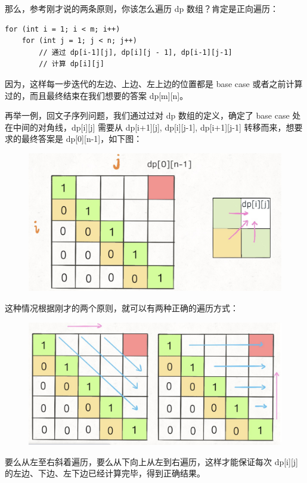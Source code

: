 \documentclass[12pt]{article}
\begin{document}
那么，参考刚才说的两条原则，你该怎么遍历 dp 数组？肯定是正向遍历：
\begin{lstlisting}
for (int i = 1; i < m; i++)
    for (int j = 1; j < n; j++)
        // 通过 dp[i-1][j], dp[i][j - 1], dp[i-1][j-1]
        // 计算 dp[i][j]
\end{lstlisting}
因为，这样每一步迭代的左边、上边、左上边的位置都是 base case 或者之前计算过的，而且最终结束在我们想要的答案 dp[m][n]。

再举一例，回文子序列问题，我们通过过对 dp 数组的定义，确定了 base case 处在中间的对角线，dp[i][j] 需要从 dp[i+1][j], dp[i][j-1], dp[i+1][j-1] 转移而来，想要求的最终答案是 dp[0][n-1]，如下图：
\begin{figure}[H]
    \centering
    \includegraphics[width=1\textwidth]{fig/Dynamic_Programming_Longest_Recursive_Text_1.png}
\end{figure}

这种情况根据刚才的两个原则，就可以有两种正确的遍历方式：
\begin{figure}[H]
    \centering
    \includegraphics[width=1\textwidth]{fig/Dynamic_Programming_Longest_Recursive_Text_2.png}
\end{figure}

要么从左至右斜着遍历，要么从下向上从左到右遍历，这样才能保证每次 dp[i][j] 的左边、下边、左下边已经计算完毕，得到正确结果。
\end{document}
